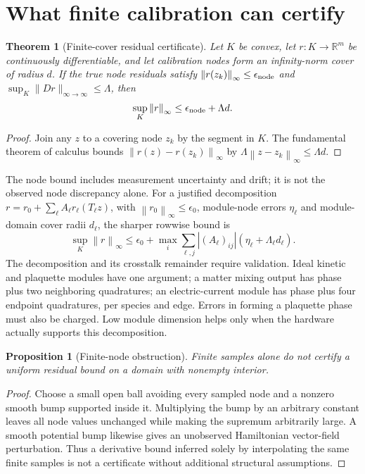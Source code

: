 \documentclass[10pt,a4paper]{article}
\newcommand{\norm}[1]{\left\|#1\right\|_\infty}
\newtheorem{theorem}{Theorem}
\newtheorem{proposition}{Proposition}
\begin{document}
\section{What finite calibration can certify}
\begin{theorem}[Finite-cover residual certificate]
Let $K$ be convex, let $r:K\to\mathbb R^m$ be continuously differentiable, and let calibration nodes form an infinity-norm cover of radius $d$. If the true node residuals satisfy $\norm{r(z_k)}\leq\epsilon_{\rm node}$ and
$\sup_K\|Dr\|_{\infty\to\infty}\leq\Lambda$, then
\begin{equation}
\sup_K\norm{r}\leq\epsilon_{\rm node}+\Lambda d .
\end{equation}
\end{theorem}
\begin{proof}
Join any $z$ to a covering node $z_k$ by the segment in $K$. The fundamental theorem of calculus bounds $\norm{r(z)-r(z_k)}$ by $\Lambda\norm{z-z_k}\leq\Lambda d$.
\end{proof}
The node bound includes measurement uncertainty and drift; it is not the observed node discrepancy alone. For a justified decomposition
$r=r_0+\sum_\ell A_\ell r_\ell(T_\ell z)$, with $\norm{r_0}\leq\epsilon_0$, module-node errors $\eta_\ell$ and module-domain cover radii $d_\ell$, the sharper rowwise bound is
\begin{equation}
\sup_K\norm{r}\leq\epsilon_0+
\max_i\sum_{\ell,j}|(A_\ell)_{ij}|(\eta_\ell+\Lambda_\ell d_\ell).
\end{equation}
The decomposition and its crosstalk remainder require validation. Ideal kinetic and plaquette modules have one argument; a matter mixing output has phase plus two neighboring quadratures; an electric-current module has phase plus four endpoint quadratures, per species and edge. Errors in forming a plaquette phase must also be charged. Low module dimension helps only when the hardware actually supports this decomposition.

\begin{proposition}[Finite-node obstruction]
Finite samples alone do not certify a uniform residual bound on a domain with nonempty interior.
\end{proposition}
\begin{proof}
Choose a small open ball avoiding every sampled node and a nonzero smooth bump supported inside it. Multiplying the bump by an arbitrary constant leaves all node values unchanged while making the supremum arbitrarily large. A smooth potential bump likewise gives an unobserved Hamiltonian vector-field perturbation. Thus a derivative bound inferred solely by interpolating the same finite samples is not a certificate without additional structural assumptions.
\end{proof}
\end{document}
